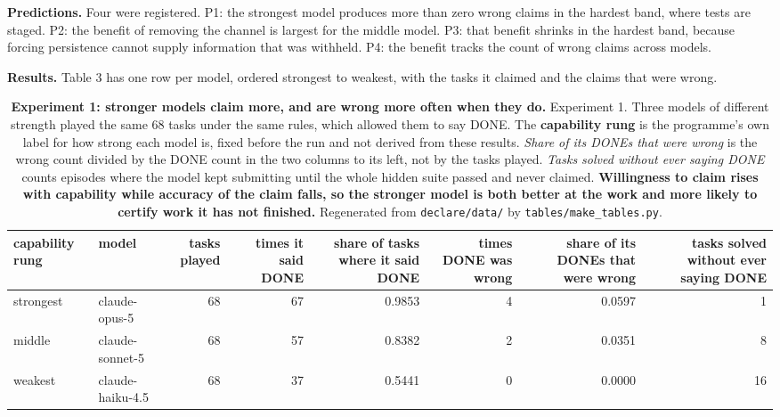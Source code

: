 \documentclass[11pt]{article}
\begin{document}
\textbf{Predictions.} Four were registered. P1: the strongest model produces more than zero wrong claims in the hardest band, where tests are staged. P2: the benefit of removing the channel is largest for the middle model. P3: that benefit shrinks in the hardest band, because forcing persistence cannot supply information that was withheld. P4: the benefit tracks the count of wrong claims across models.

\textbf{Results.} Table 3 has one row per model, ordered strongest to weakest, with the tasks it claimed and the claims that were wrong.

\begin{table}[t]
\centering
\small
\setlength{\tabcolsep}{3.4pt}
\begin{tabularx}{\textwidth}{L{1.311}L{2.098}R{0.787}R{0.656}R{0.787}R{0.656}R{0.787}R{0.918}}
\toprule
\textbf{capability rung} & \textbf{model} & \textbf{tasks played} & \textbf{times it said DONE} & \textbf{share of tasks where it said DONE} & \textbf{times DONE was wrong} & \textbf{share of its DONEs that were wrong} & \textbf{tasks solved without ever saying DONE} \\
\midrule
strongest & claude-opus-5 & 68 & 67 & 0.9853 & 4 & 0.0597 & 1 \\
middle & claude-sonnet-5 & 68 & 57 & 0.8382 & 2 & 0.0351 & 8 \\
weakest & claude-haiku-4.5 & 68 & 37 & 0.5441 & 0 & 0.0000 & 16 \\
\bottomrule
\end{tabularx}
\caption{\textbf{Experiment 1: stronger models claim more, and are wrong more often when they do.} Experiment 1. Three models of different strength played the same 68 tasks under the same rules, which allowed them to say DONE. The \textbf{capability rung} is the programme's own label for how strong each model is, fixed before the run and not derived from these results. \emph{Share of its DONEs that were wrong} is the wrong count divided by the DONE count in the two columns to its left, not by the tasks played. \emph{Tasks solved without ever saying DONE} counts episodes where the model kept submitting until the whole hidden suite passed and never claimed. \textbf{Willingness to claim rises with capability while accuracy of the claim falls, so the stronger model is both better at the work and more likely to certify work it has not finished.} Regenerated from \texttt{declare/data/} by \texttt{tables/make\_tables.py}.}
\label{tab:T3}
\end{table}
\end{document}
